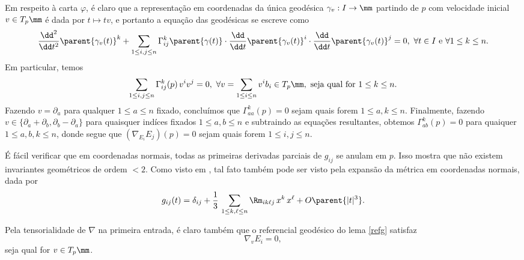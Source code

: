 \begin{demm}
\[\] 
Em respeito à carta $\varphi$, é claro que a representação em coordenadas da única geodésica $\gamma_v : I \to \mm$ partindo de $p$ com velocidade inicial $v \in T_p \mm$ é dada por $t \mapsto t v$, e portanto a equação das geodésicas se escreve como
\[
\frac{\dd^2}{\dd t^2}  \parent{\gamma_v(t)}^k + \sum_{1 \leq i, j \leq n} \Gamma_{ij}^k \parent{\gamma(t)} \cdot \frac{\dd}{\dd t}  \parent{\gamma_v(t)}^i \cdot  \frac{\dd}{\dd t}  \parent{\gamma_v(t)}^j = 0, \ \forall t \in I \text{ e } \forall 1 \leq k \leq n.
\]
Em particular, temos
\[
\sum_{1 \leq i, j \leq n} \Gamma_{ij}^k (p) \, v^i v^j = 0, \ \forall v = \sum_{1 \leq i \leq n} v^i b_i \in T_p \mm, \text{ seja qual for } 1 \leq k \leq n.
\]
Fazendo $v = \partial_a$ para qualquer $1 \leq a \leq n$ fixado, concluímos que $\Gamma_{aa}^k(p) = 0$ sejam quais forem $1 \leq a, k \leq n$. Finalmente, fazendo $v \in \{\partial_a + \partial_b, \partial_{b} - \partial_a \}$ para quaisquer indíces fixados $1 \leq a, b \leq n$ e subtraindo as equações resultantes, obtemos $\Gamma^k_{ab}(p) = 0$ para quaiquer $1 \leq a, b, k \leq n$, donde segue que $(\nabla_{E_i} E_j)(p) = 0$ sejam quais forem $1 \leq i, j \leq n$.
\end{demm}
\begin{oobs}
É fácil verificar que em coordenadas normais, todas as primeiras derivadas parciais de $g_{ij}$ se anulam em $p$. Isso mostra que não existem invariantes geométricos de ordem $< 2$. Como visto em , tal fato também pode ser visto pela expansão da métrica em coordenadas normais, dada por
\[
g_{ij}(t) = \delta_{ij} + \frac{1}{3} \, \sum_{1 \leq k, \ell \leq n}  \Rm_{ik \ell j} \, x^k \, x^{\ell} + O\parent{|t|^3}.
\]
\end{oobs}
\begin{oobs}\label{XrefG}
Pela tensorialidade de $\nabla$ na primeira entrada, é claro também que o referencial geodésico do lema \cref{refg} satisfaz
\[
\nabla_{v} E_i = 0,
\]
seja qual for $v \in T_p \mm$.
\end{oobs}


